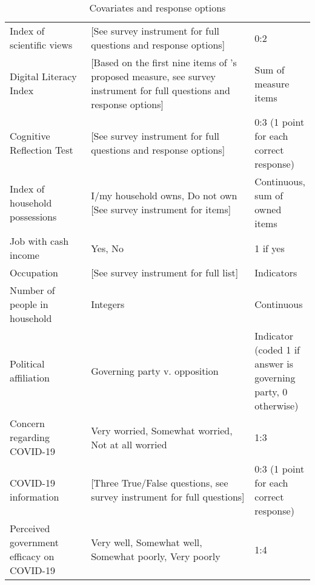 \begin{table}[H]
\begin{adjustbox}{totalheight=.9\baselineskip, max width = \textwidth}
\begin{tabular}{p{0.3\linewidth}p{0.7\linewidth}p{0.25\linewidth}}
Index   of scientific views                 & [See   survey instrument for full questions and response options] & 0:2                     \\
Digital Literacy Index &  {[}Based on the first nine items of \cite{guessetal2020digital}'s  proposed measure, see  survey instrument for full questions and response options{]}& Sum of measure items\\
Cognitive Reflection Test& {[}See   survey instrument for full questions and response options{]}& 0:3 (1 point for each correct response)\\
Index of household possessions%
&
  I/my household owns, Do not own [See survey instrument for items] &
  Continuous, sum of owned items \\
Job   with cash income                      & Yes,   No                                                  & 1 if yes                \\
Occupation                                  & {[}See   survey instrument for full list{]}                & Indicators              \\
Number   of people in household             & Integers                                                   & Continuous              \\
Political affiliation & Governing party v. opposition & Indicator (coded 1 if answer is governing party, 0 otherwise)\\
Concern regarding COVID-19                  & Very   worried, Somewhat worried, Not at all worried       & 1:3                     \\
COVID-19 information & [Three True/False questions, see survey instrument for full questions] & 0:3 (1 point for each correct response)\\
Perceived government efficacy   on COVID-19 & Very   well, Somewhat well, Somewhat poorly, Very poorly   & 1:4 \\
\end{tabular} 
\end{adjustbox}
\caption{Covariates and response options}
\label{cov_long}
\end{table}